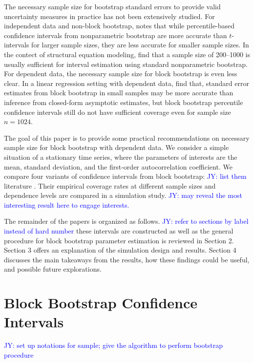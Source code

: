 \documentclass[12pt, letterpaper, titlepage]{article}
\newcommand{\jy}[1]{\textcolor{blue}{JY: #1}}
\begin{document}
The necessary sample size for bootstrap standard errors to provide valid
uncertainty measures in practice has not been extensively studied. For
independent data and non-block bootstrap, \citet{hesterberg2015teachers} notes
that while percentile-based confidence intervals from nonparametric bootstrap
are more accurate than $t$-intervals for larger sample sizes, they are
less accurate for smaller sample sizes. In the contect of structural equation
modeling, \citet{nevitt2001performance} find
that a sample size of 200--1000 is usually sufficient for interval estimation
using standard nonparametric bootstrap. For dependent data, the necessary sample
size for block bootstrap is even less clear. In a linear regression setting with
dependent data, \citet{goncalves2005bootstrap} find that, standard error
estimates from block bootstrap in small samples may be more accurate than
inference from closed-form asymptotic estimates, but block bootstrap percentile
confidence intervals still do not have sufficient coverage even for sample size
$n = 1024$.


The goal of this paper is to provide some practical recommendations on necessary
sample size for block bootstrap with dependent data. We consider a simple
situation of a stationary time series, where the parameters of interests are the
mean, standard deviation, and the first-order autocorrelation coefficient.
We compare four variants of confidence intervals from block bootstrap:
\jy{list them} literature \citep{diciccio1996bootstrap}
\citep{rice2006mathematical}.
Their empirical coverage rates at different sample sizes and dependence levels
are compared in a simulation study.
\jy{may reveal the most interesting result here to engage interests.}



The remainder of the papers is organized as follows.
\jy{refer to sections by label instead of hard number}
these intervals are constructed as well as the general procedure for block
bootstrap parameter estimation is reviewed in Section 2. Section 3 offers an
explanation of the simulation design and results. Section 4 discusses the main
takeaways from the results, how these findings could be useful, and possible
future explorations.


\section{Block Bootstrap Confidence Intervals}
\label{sec:blkbootreview}

\jy{set up notations for sample; give the algorithm to perform bootstrap
  procedure}
\end{document}
